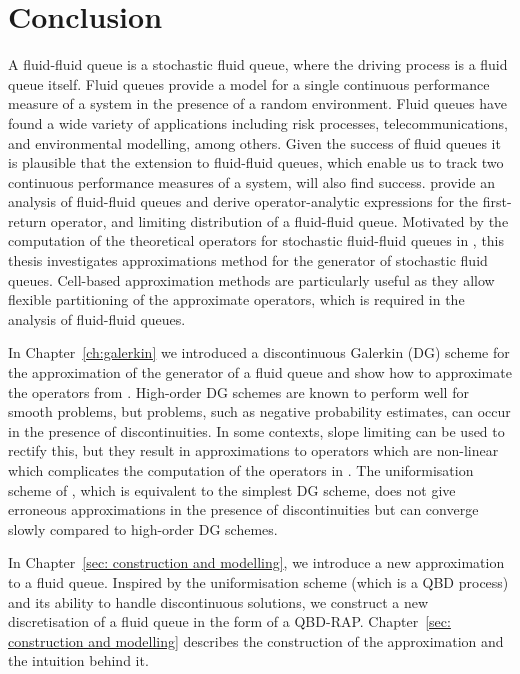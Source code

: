 \chapter{Conclusion\label{ch: conclusion}} 
A fluid-fluid queue is a stochastic fluid queue, where the driving process is a fluid queue itself. Fluid queues provide a model for a single continuous performance measure of a system in the presence of a random environment. Fluid queues have found a wide variety of applications including risk processes, telecommunications, and environmental modelling, among others. Given the success of fluid queues it is plausible that the extension to fluid-fluid queues, which enable us to track two continuous performance measures of a system, will also find success. \cite{bo2014} provide an analysis of fluid-fluid queues and derive operator-analytic expressions for the first-return operator, and limiting distribution of a fluid-fluid queue. Motivated by the computation of the theoretical operators for stochastic fluid-fluid queues in \cite{bo2014}, this thesis investigates approximations method for the generator of stochastic fluid queues. Cell-based approximation methods are particularly useful as they allow flexible partitioning of the approximate operators, which is required in the analysis of fluid-fluid queues. 

In Chapter~\ref{ch:galerkin} we introduced a discontinuous Galerkin (DG) scheme for the approximation of the generator of a fluid queue and show how to approximate the operators from \cite{bo2014}. High-order DG schemes are known to perform well for smooth problems, but problems, such as negative probability estimates, can occur in the presence of discontinuities. In some contexts, slope limiting can be used to rectify this, but they result in approximations to operators which are non-linear which complicates the computation of the operators in \cite{bo2014}. The uniformisation scheme of \cite{bo2013}, which is equivalent to the simplest DG scheme, does not give erroneous approximations in the presence of discontinuities but can converge slowly compared to high-order DG schemes. 

In Chapter~\ref{sec: construction and modelling}, we introduce a new approximation to a fluid queue. Inspired by the uniformisation scheme (which is a QBD process) and its ability to handle discontinuous solutions, we construct a new discretisation of a fluid queue in the form of a QBD-RAP. Chapter~\ref{sec: construction and modelling} describes the construction of the approximation and the intuition behind it. 

